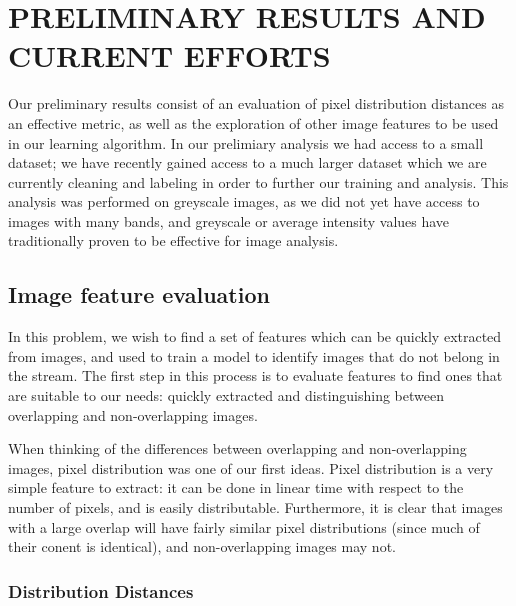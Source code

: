 %
%
%



\chapter{PRELIMINARY RESULTS AND CURRENT EFFORTS}
Our preliminary results consist of an evaluation of pixel distribution distances as an effective metric, as well as the exploration of other image features to be used in our learning algorithm.
In our prelimiary analysis we had access to a small dataset; we have recently gained access to a much larger dataset which we are currently cleaning and labeling in order to further our training and analysis.
This analysis was performed on greyscale images, as we did not yet have access to images with many bands, and greyscale or average intensity values have traditionally proven to be effective for image analysis.

\section{Image feature evaluation}
In this problem, we wish to find a set of features which can be quickly extracted from images, and used to train a model to identify images that do not belong in the stream.
The first step in this process is to evaluate features to find ones that are suitable to our needs: quickly extracted and distinguishing between overlapping and non-overlapping images.

When thinking of the differences between overlapping and non-overlapping images, pixel distribution was one of our first ideas.
Pixel distribution is a very simple feature to extract: it can be done in linear time with respect to the number of pixels, and is easily distributable.
Furthermore, it is clear that images with a large overlap will have fairly similar pixel distributions (since much of their conent is identical), and non-overlapping images may not.


\subsection{Distribution Distances}

